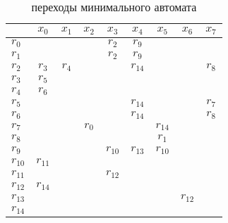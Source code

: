 \documentclass[a4paper,14pt,russian]{extarticle} %
\begin{document}
\begin{table}[H]
	\centering
	\begin{threeparttable}	
		\caption{переходы минимального автомата}	
		\renewcommand{\arraystretch}{0.7}
		\renewcommand{\tabcolsep}{0.9em}	
		\label{tab:state_machine_min} 
		\begin{tabular}{| l | c |c |c |c |c |c |c |c |}
			\hline
			& \({x_{0}}\) & \({x_{1}}\) & \({x_{2}}\) & \({x_{3}}\) & \({x_{4}}\) & \({x_{5}}\) & \({x_{6}}\) & \({x_{7}}\) \\ \hline
			\({r_{0}}\) & \(\) & \(\) & \(\) & \({r_{2}}\) & \({r_{9}}\) & \(\) & \(\) & \(\) \\ \hline
			\({r_{1}}\) & \(\) & \(\) & \(\) & \({r_{2}}\) & \({r_{9}}\) & \(\) & \(\) & \(\) \\ \hline
			\({r_{2}}\) & \({r_{3}}\) & \({r_{4}}\) & \(\) & \(\) & \({r_{14}}\) & \(\) & \(\) & \({r_{8}}\) \\ \hline
			\({r_{3}}\) & \({r_{5}}\) & \(\) & \(\) & \(\) & \(\) & \(\) & \(\) & \(\) \\ \hline
			\({r_{4}}\) & \({r_{6}}\) & \(\) & \(\) & \(\) & \(\) & \(\) & \(\) & \(\) \\ \hline
			\({r_{5}}\) & \(\) & \(\) & \(\) & \(\) & \({r_{14}}\) & \(\) & \(\) & \({r_{7}}\) \\ \hline
			\({r_{6}}\) & \(\) & \(\) & \(\) & \(\) & \({r_{14}}\) & \(\) & \(\) & \({r_{8}}\) \\ \hline
			\({r_{7}}\) & \(\) & \(\) & \({r_{0}}\) & \(\) & \(\) & \({r_{14}}\) & \(\) & \(\) \\ \hline
			\({r_{8}}\) & \(\) & \(\) & \(\) & \(\) & \(\) & \({r_{1}}\) & \(\) & \(\) \\ \hline
			\({r_{9}}\) & \(\) & \(\) & \(\) & \({r_{10}}\) & \({r_{13}}\) & \({r_{10}}\) & \(\) & \(\) \\ \hline
			\({r_{10}}\) & \({r_{11}}\) & \(\) & \(\) & \(\) & \(\) & \(\) & \(\) & \(\) \\ \hline
			\({r_{11}}\) & \(\) & \(\) & \(\) & \({r_{12}}\) & \(\) & \(\) & \(\) & \(\) \\ \hline
			\({r_{12}}\) & \({r_{14}}\) & \(\) & \(\) & \(\) & \(\) & \(\) & \(\) & \(\) \\ \hline
			\({r_{13}}\) & \(\) & \(\) & \(\) & \(\) & \(\) & \(\) & \({r_{12}}\) & \(\) \\ \hline
			\({r_{14}}\) & \(\) & \(\) & \(\) & \(\) & \(\) & \(\) & \(\) & \(\) \\ \hline
		\end{tabular}
	\end{threeparttable}		
\end{table}	
\end{document}
